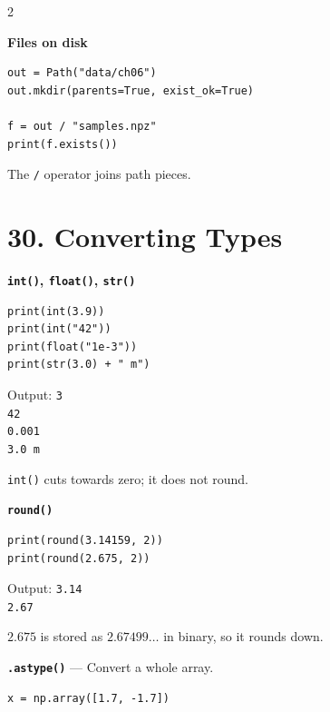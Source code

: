 \documentclass[10pt,a4paper]{article}
\begin{document}
\begin{multicols}{2}
\begin{card}
\textbf{Files on disk}

\begin{lstlisting}[style=pythonstyle]
out = Path("data/ch06")
out.mkdir(parents=True, exist_ok=True)

f = out / "samples.npz"
print(f.exists())
\end{lstlisting}

The \texttt{/} operator joins path pieces.
\end{card}

\section*{30. Converting Types}

\begin{card}
\textbf{\texttt{int()}, \texttt{float()}, \texttt{str()}}

\begin{lstlisting}[style=pythonstyle]
print(int(3.9))
print(int("42"))
print(float("1e-3"))
print(str(3.0) + " m")
\end{lstlisting}

Output:
\texttt{3}\\
\texttt{42}\\
\texttt{0.001}\\
\texttt{3.0 m}

\texttt{int()} cuts towards zero; it does not round.
\end{card}

\begin{card}
\textbf{\texttt{round()}}

\begin{lstlisting}[style=pythonstyle]
print(round(3.14159, 2))
print(round(2.675, 2))
\end{lstlisting}

Output:
\texttt{3.14}\\
\texttt{2.67}

$2.675$ is stored as $2.67499\ldots$ in binary, so it rounds down.
\end{card}

\begin{card}
\textbf{\texttt{.astype()}} --- Convert a whole array.

\begin{lstlisting}[style=pythonstyle]
x = np.array([1.7, -1.7])


\end{lstlisting}
\end{card}
\end{multicols}
\end{document}
